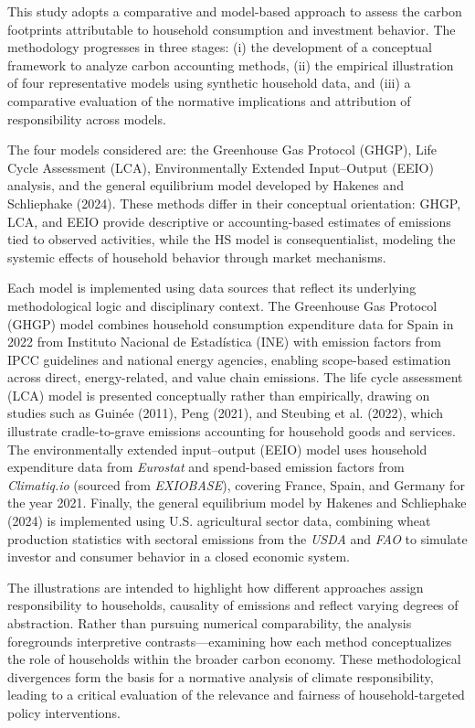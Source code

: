 \documentclass[12pt,a4paper]{article}%
\begin{document}
This study adopts a comparative and model-based approach to assess the carbon footprints attributable to household consumption and investment behavior. The methodology progresses in three stages: (i) the development of a conceptual framework to analyze carbon accounting methods, (ii) the empirical illustration of four representative models using synthetic household data, and (iii) a comparative evaluation of the normative implications and attribution of responsibility across models. 

The four models considered are: the Greenhouse Gas Protocol (GHGP), Life Cycle Assessment (LCA), Environmentally Extended Input–Output (EEIO) analysis, and the general equilibrium model developed by Hakenes and Schliephake (2024). These methods differ in their conceptual orientation: GHGP, LCA, and EEIO provide descriptive or accounting-based estimates of emissions tied to observed activities, while the HS model is consequentialist, modeling the systemic effects of household behavior through market mechanisms. 

Each model is implemented using data sources that reflect its underlying methodological logic and disciplinary context. The Greenhouse Gas Protocol (GHGP) model combines household consumption expenditure data for Spain in 2022 from Instituto Nacional de Estadística (INE) with emission factors from IPCC guidelines and national energy agencies, enabling scope-based estimation across direct, energy-related, and value chain emissions. The life cycle assessment (LCA) model is presented conceptually rather than empirically, drawing on studies such as Guinée (2011), Peng (2021), and Steubing et al. (2022), which illustrate cradle-to-grave emissions accounting for household goods and services. The environmentally extended input--output (EEIO) model uses household expenditure data from \textit{Eurostat} and spend-based emission factors from \textit{Climatiq.io} (sourced from \textit{EXIOBASE}), covering France, Spain, and Germany for the year 2021. Finally, the general equilibrium model by Hakenes and Schliephake (2024) is implemented using U.S. agricultural sector data, combining wheat production statistics with sectoral emissions from the \textit{USDA} and \textit{FAO} to simulate investor and consumer behavior in a closed economic system. 

The illustrations are intended to highlight how different approaches assign responsibility to households, causality of emissions and reflect varying degrees of abstraction. Rather than pursuing numerical comparability, the analysis foregrounds interpretive contrasts—examining how each method conceptualizes the role of households within the broader carbon economy. These methodological divergences form the basis for a normative analysis of climate responsibility, leading to a critical evaluation of the relevance and fairness of household-targeted policy interventions.
\end{document}
